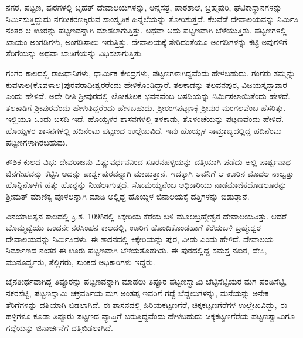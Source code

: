 ನಗರ, ಪಟ್ಟಣ, ಪುರಗಳಲ್ಲಿ ಬೃಹತ್​ ದೇವಾಲಯಗಳನ್ನು, ಅನ್ನಸತ್ರ, ಪಾಠಶಾಲೆ, ಬ್ರಹ್ಮಪುರಿ, ಘಟಿಕಾಸ್ಥಾನಗಳನ್ನು ನಿರ್ಮಿಸುತ್ತಿದ್ದುದು ನಗರೀಕರಣಕ್ಕಿರುವ ಸಾಂಸ್ಕೃತಿಕ ಹಿನ್ನೆಲೆಯನ್ನು ತೋರಿಸುತ್ತದೆ. ಕೆಲವೆಡೆ ದೇವಾಲಯವನ್ನು ನಿರ್ಮಿಸಿ ನಂತರ ಆ ಊರನ್ನು ಪಟ್ಟಣವನ್ನಾಗಿ ಮಾಡಲಾಗುತ್ತಿತ್ತು. ಅಥವಾ ಅದು ಪಟ್ಟಣವಾಗಿ ಬೆಳೆಯುತ್ತಿತು. ಪಟ್ಟಣಗಳಲ್ಲಿ ಖಾಯಂ ಅಂಗಡಿಗಳು, ಅಂಗಡಿಸಾಲು ಇರುತ್ತಿತ್ತು. ದೇವಾಲಯಕ್ಕೆ ಸೇರಿದಂತೆಯೂ ಅಂಗಡಿಗಳನ್ನು ಕಟ್ಟಿ ಅವುಗಳಿಗೆ ತೆರಿಗೆಯನ್ನು ಅಥವಾ ಬಾಡಿಗೆಯನ್ನು ವಿಧಿಸಲಾಗುತ್ತಿತು.

ಗಂಗರ ಕಾಲದಲ್ಲಿ ರಾಜಧಾನಿಗಳು, ಧಾರ್ಮಿಕ ಕೇಂದ್ರಗಳು, ಪಟ್ಟಣಗಳಾಗಿದ್ದವೆಂದು ಹೇಳಬಹುದು. ಗಂಗರು ತಮ್ಮನ್ನು ಕುವಳಾಲ(ಕೊವಳಾಲ)ಪುರವರಾಧೀಶ್ವರರೆಂದು ಹೇಳಿಕೊಂಡಿದ್ದಾರೆ. ತಲಕಾಡನ್ನು ತಲವನಪುರ, ವಿಜಯಸ್ಕನ್ದಾವಾರ ಎಂದು ಹೇಳಿದೆ. ಅದೇ ರೀತಿ ಶ‍್ರೀವುರದಲ್ಲಿ ಲೋಕತಿಲಕ ಭವನವೆಂಬ ಬಸದಿಯನ್ನು ನಿರ್ಮಿಸಲಾಯಿತೆಂದು ಹೇಳಿದೆ. ತಲಕಾಡಿಗೆ ಶ‍್ರೀಪುರವೆಂದು ಹೇಳುತಿದ್ದರೆಂದು ಹೇಳಬಹುದು. ಶ‍್ರೀರಂಗಪಟ್ಟಣಕ್ಕೆ ಶ‍್ರೀವುರ ಮಂಗಲವೆಂಬ ಹೆಸರಿತ್ತು. ಇಲ್ಲಿಯೂ ಒಂದು ಬಸದಿ ಇದೆ. ಹೊಯ್ಸಳರ ಶಾಸನಗಳಲ್ಲಿ ತಳಕಾಡು, ತೊಳಂಚೆಯನ್ನು ಪಟ್ಟಣವೆಂದು ಹೇಳಿದೆ. ಹೊಯ್ಸಳರ ಶಾಸನಗಳಲ್ಲಿ ಹದಿನೆಂಟು ಪಟ್ಟಣದ ಉಲ್ಲೇಖವಿದೆ. ಇವು ಹೊಯ್ಸಳ ಸಾಮ್ರಾಜ್ಯದಲ್ಲಿದ್ದ ಹದಿನೆಂಟು ಪಟ್ಟಣಗಳಾಗಿರಬಹುದು.

ಕೌಶಿಕ ಕುಲದ ವಿಭು ದೇವರಾಜನು ವಿಷ್ಣುವರ್ಧನನಿಂದ ಸೂರನಹಳ್ಳಿಯನ್ನು ದತ್ತಿಯಾಗಿ ಪಡೆದು ಅಲ್ಲಿ ಪಾರ್ಶ್ವನಾಥ ಜಿನಗೇಹವನ್ನು ಕಟ್ಟಿಸಿ ಅದನ್ನು ಪಾರ್ಶ್ವಪುರವನ್ನಾಗಿ ಮಾಡುತ್ತಾನೆ. ಇದಕ್ಕಾಗಿ ಅವನಿಗೆ ಆ ಊರಿನ ಮೊದಲ ನಾಲ್ವತ್ತು ಹೊನ್ನಿನೊಳಗೆ ಹತ್ತು ಹೊನ್ನನ್ನು ನೀಡಲಾಗುತ್ತದೆ. ಸೋಮಯ್ಯನೆಂಬ ಅಧಿಕಾರಿಯು ನಾಡಮಾಣಿಕದೊಡಲೂರನ್ನು ಶ‍್ರೀಮತ್​ ಮಾಣಿಕ್ಯ ಪೊಳಲನ್ನಾಗಿ ಮಾಡಿ ಅಲ್ಲಿದ್ದ ಹೊಯ್ಸಳ ಜಿನಾಲಯಕ್ಕೆ ದತ್ತಿಗಳನ್ನು ಬಿಡುತ್ತಾನೆ.

ವಿನಯಾದಿತ್ಯನ ಕಾಲದಲ್ಲಿ ಕ್ರಿ.ಶ. 1095ರಲ್ಲಿ ಕಿಕ್ಕೇರಿಯ ಕೆರೆಯ ಬಳಿ ಮೂಲಬ್ರಹ್ಮೇಶ್ವರ ದೇವಾಲಯವಿತ್ತು. ಆದರೆ ಬೊಮ್ಮವ್ವೆಯು ಒಂದನೇ ನರಸಿಂಹನ ಕಾಲದಲ್ಲಿ, ಊರಿಗೆ ಹೊಂದಿಕೊಂಡಹಾಗೆ ಕೆರೆಯಬಳಿ ಬ್ರಹ್ಮೇಶ್ವರ ದೇವಾಲಯವನ್ನು ನಿರ್ಮಿಸಿದಳು. ಈ ಶಾಸನದಲ್ಲಿ ಕಿಕ್ಕೇರಿಯನ್ನು ಪುರ, ವೀಡು ಎಂದು ಹೇಳಿದೆ. ದೇವಾಲಯ ನಿರ್ಮಾಣದ ನಂತರ ಈ ಊರು ಪಟ್ಟಣವಾಗಿ ಬೆಳೆಯತೊಡಗಿತು. ಈ ಪುರದಲ್ಲಿದ್ದ ಸಮಸ್ತ ನಖರ, ದೇಸಿ, ಮುನೂರ್ವ್ವರು, ತೆಲ್ಲಿಗರು, ಸುಂಕದ ಅಧಿಕಾರಿಗಳು ಇದ್ದರು.

ಜೈನತೀರ್ಥವಾಗಿದ್ದ ತಿಪ್ಪೂರನ್ನು ಪಟ್ಟಣವನ್ನಾಗಿ ಮಾಡಲು ತಿಪ್ಪೂರ ಪಟ್ಟಣಸ್ವಾಮಿ ಚೆಟ್ಟಿಸೆಟ್ಟಿಯರ ಮಗ ಪರಡಿಸೆಟ್ಟಿ, ನಕರಸೆಟ್ಟಿ, ಪಟ್ಟಣಸ್ವಾಮಿ ಚಕ್ರವರ್ತಿಯ ಮಗ ಅಂತಪ್ಪ ಇವರಿಗೆ ಗದ್ದೆ ಬೆದ್ದಲುಗಳನ್ನು, ಮನೆಯನ್ನು ಅನೇಕ ತೆರಿಗೆಗಳನ್ನು ದತ್ತಿಯಾಗಿ ಬಿಡಲಾಗಿದೆ. ಈ ಶಾಸನದಲ್ಲಿ ಹಿರಿಯಕಟ್ಟಣಗೆರೆ, ಚಿಕ್ಕಕಟ್ಟಣಗೆರೆಗಳ ಉಲ್ಲೇಖವಿದ್ದು, ಈ ಹಳ್ಳಿಗಳೂ ಕೂಡಾ ತಿಪ್ಪೂರು ಪಟ್ಟಣದ ವ್ಯಾಪ್ತಿಗೆ ಬರುತ್ತಿದ್ದವೆಂದು ಹೇಳಬಹುದು ಚಿಕ್ಕಕಟ್ಟಣಗೆರೆಯ ಪಟ್ಟಣಸ್ವಾಮಿಗೂ ಗದ್ದೆಯನ್ನು ಜಿನಾರ್ಚನೆಗೆ ದತ್ತಿಬಿಡಲಾಗಿದೆ.

